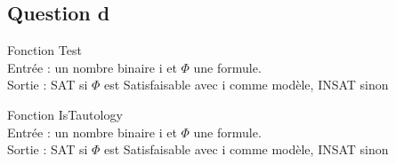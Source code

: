 \documentclass[12pt]{report}
\begin{document}
\subsection*{Question d}
\begin{algorithm}[H]
	Fonction Test \\
	Entrée : un nombre binaire i et $\Phi$ une formule. \\
	Sortie : SAT si $\Phi$ est Satisfaisable avec i comme modèle, INSAT sinon
\end{algorithm}

\begin{algorithm}[H]
	Fonction IsTautology \\
	Entrée : un nombre binaire i et $\Phi$ une formule. \\
	Sortie : SAT si $\Phi$ est Satisfaisable avec i comme modèle, INSAT sinon \\
\end{algorithm}
\end{document}
